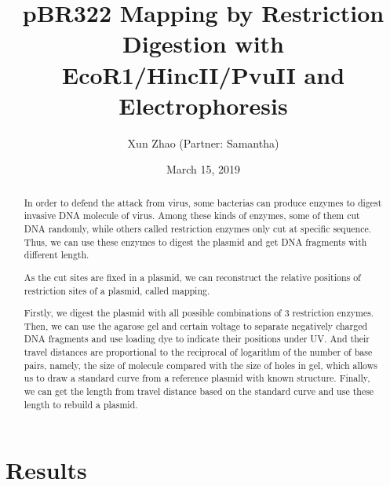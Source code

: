 \documentclass{article}
\title{\bf{pBR322 Mapping by Restriction Digestion with EcoR1/HincII/PvuII and Electrophoresis}}
\author{Xun Zhao (Partner: Samantha)}
\date{March 15, 2019}
\begin{document}
    \begin{titlepage}
        \maketitle
        \setcounter{page}{0}
        \thispagestyle{empty}
    \end{titlepage}

    \renewcommand{\abstractname}{Introduction}
    \begin{abstract}
        In order to defend the attack from virus, some bacterias can produce enzymes to digest invasive DNA molecule of virus. Among these kinds of enzymes, some of them cut DNA randomly, while others called restriction enzymes only cut at specific sequence. Thus, we can use these enzymes to digest the plasmid and get DNA fragments with different length. 

        As the cut sites are fixed in a plasmid, we can reconstruct the relative positions of restriction sites of a plasmid, called mapping.

        Firstly, we digest the plasmid with all possible combinations of 3 restriction enzymes. Then, we can use the agarose gel and certain voltage to separate negatively charged DNA fragments and use loading dye to indicate their positions under UV. And their travel distances are proportional to the reciprocal of logarithm of the number of base pairs, namely, the size of molecule compared with the size of holes in gel, which allows us to draw a standard curve from a reference plasmid with known structure. Finally, we can get the length from travel distance based on the standard curve and use these length to rebuild a plasmid.
    \end{abstract}

    \section{Results}
\end{document}
